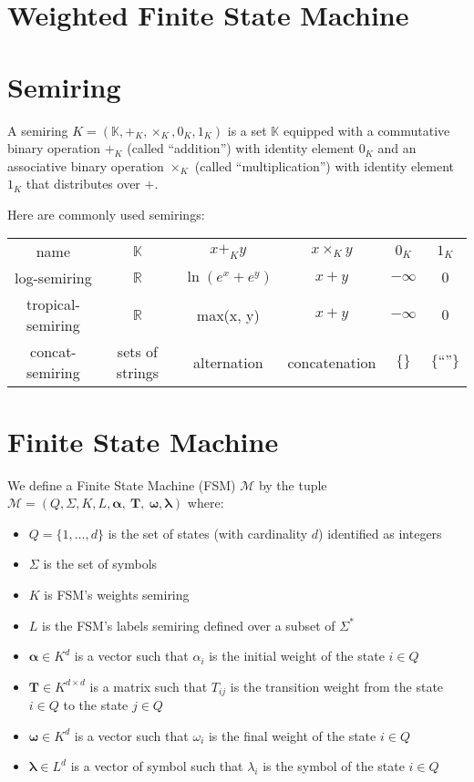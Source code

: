 \section{Weighted Finite State Machine}

\section{Semiring}

A semiring $K = (\mathbb{K}, +_K, \times_K, 0_K, 1_K)$ is a set $\mathbb{K}$
equipped with a commutative binary operation $+_K$ (called ``addition'')
with identity element $0_K$ and an associative binary operation $\times_K$
(called ``multiplication'') with identity element $1_K$ that distributes
over $+$.

Here are commonly used semirings:

\begin{table}[h]
    \begin{tabular}{cccccc}
        \toprule
        name & $\mathbb{K}$ & $x +_K y$ & $x \times_K y $ & $0_K$ & $1_K$ \\
        log-semiring & $\mathbb{R}$ & $ \ln(e^x + e^y) $ & $x + y$ & $-\infty$ & $0$ \\
        tropical-semiring & $\mathbb{R}$ & $ $max(x, y)$ $ & $x + y$ & $-\infty$ & $0$ \\
        concat-semiring & sets of strings & alternation & concatenation & $\{\}$ & $\{\text{``''}\}$ \\
        \bottomrule
    \end{tabular}
\end{table}

\section{Finite State Machine}

We define a Finite State Machine (FSM) $\mathcal{M}$ by the tuple
$\mathcal{M} = (Q, \Sigma, K, L, \boldsymbol{\alpha},~\mathbf{T},~\boldsymbol{\omega}, \boldsymbol{\lambda})$
where:
\begin{itemize}
    \item $Q = \{1, \dots, d\}$ is the set of states (with cardinality $d$)
        identified as integers
    \item $\Sigma$ is the set of symbols
    \item $K$ is FSM's weights semiring
    \item $L$ is the FSM's labels semiring defined over a subset of $\Sigma^*$
    \item $\boldsymbol{\alpha} \in K^d$ is a vector such that $\alpha_i$
    is the initial weight of the state $i \in Q$
    \item $\mathbf{T} \in K^{d\times d}$ is a matrix such that $T_{ij}$
        is the transition weight from the state $i \in Q$ to the state $j \in Q$
    \item $\boldsymbol{\omega} \in K^d$ is a vector such that $\omega_i$
        is the final weight of the state $i \in Q$
    \item $\boldsymbol{\lambda} \in L^d$ is a vector of symbol such that
        $\lambda_i$ is the symbol of the state $i \in Q$
\end{itemize}

